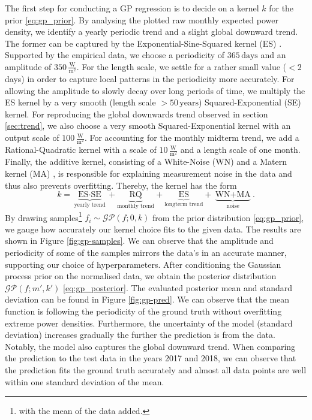 \documentclass{article}
\theoremstyle{plain}
\theoremstyle{definition}
\theoremstyle{remark}
\begin{document}
The first step for conducting a GP regression is to decide on a kernel $k$ for the prior
\eqref{eq:gp_prior}. By analysing the plotted raw monthly expected power density, we identify a
yearly periodic trend and a slight global downward trend. The former can be captured by the
Exponential-Sine-Squared kernel (ES) \cite{MacKay1998IntroductionTG}. Supported by the empirical
data, we choose a periodicity of $365 \, \text{days}$ and an amplitude of $350 \,
\frac{\textrm{W}}{\text{m}^2}$. For the length scale, we settle for a rather small value ($< 2 \, $
days) in order to capture local patterns in the periodicity more accurately. For allowing the
amplitude to slowly decay over long periods of time, we multiply the ES kernel by a very smooth
(length scale $> 50 \, \text{years}$) Squared-Exponential (SE) kernel. For reproducing the global
downwards trend observed in section \ref{sec:trend}, we also choose a very smooth
Squared-Exponential kernel with an output scale of $100 \, \frac{\textrm{W}}{\text{m}^2}$. For
accounting for the monthly midterm trend, we add a Rational-Quadratic kernel
\cite{rasmussen-williams-gp} with a scale of $10 \, \frac{\textrm{W}}{\text{m}^2}$ and a length
scale of one month. Finally, the additive kernel, consisting of a White-Noise (WN) and a Matern
kernel (MA) \cite{abramowitz1968handbook}, is responsible for explaining measurement noise in the
data and thus also prevents overfitting. Thereby, the kernel has the form 
$$k = \underbrace{\text{ES} \cdot \text{SE}}_{\text{yearly trend}} 
+ \underbrace{\text{RQ}}_\text{monthly trend} 
+ \underbrace{\text{ES}}_\text{longterm trend} 
+ \underbrace{\text{WN} 
+ \text{MA}}_{\text{noise}}.$$
By drawing samples\footnote{with the mean of the data added.} $f_i \sim
\mathcal{GP}(f; 0, k)$ from the prior distribution \eqref{eq:gp_prior}, we gauge how accurately our
kernel choice fits to the given data. The results are shown in Figure \ref{fig:gp-samples}. We can
observe that the amplitude and periodicity of some of the samples mirrors the data's in an accurate
manner, supporting our choice of hyperparameters. After conditioning the Gaussian process prior on
the normalised data, we obtain the posterior distribution $\mathcal{GP}(f; m', k')$
\eqref{eq:gp_posterior}. The evaluated posterior mean and standard deviation can be found in Figure
\ref{fig:gp-pred}. We can observe that the mean function is following the periodicity of the ground
truth without overfitting extreme power densities. Furthermore, the uncertainty of the model
(standard deviation) increases gradually the further the prediction is from the data. Notably, the
model also captures the global downward trend. When comparing the prediction to the test data in the
years 2017 and 2018, we can observe that the prediction fits the ground truth accurately and almost all
data points are well within one standard deviation of the mean.
\end{document}

